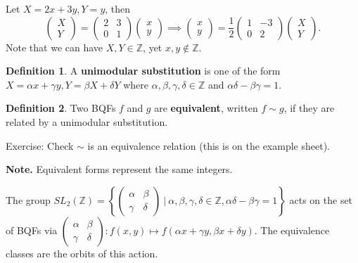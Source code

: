 \documentclass{article}
\theoremstyle{definition}
\newtheorem{defn}{Definition}[section]
\begin{document}
Let $X=2x+3y, Y=y$, then $$\begin{pmatrix} X\\Y \end{pmatrix} = \begin{pmatrix} 2 & 3\\0 & 1 \end{pmatrix}\begin{pmatrix} x \\y \end{pmatrix} \implies \begin{pmatrix} x\\y \end{pmatrix} = \frac{1}{2}\begin{pmatrix} 1 & -3 \\0 & 2 \end{pmatrix}\begin{pmatrix} X \\ Y \end{pmatrix}.$$
Note that we can have $X,Y \in \mathbb{Z}$, yet $x,y \not\in \mathbb{Z}$. 

\begin{defn}
    A \textbf{unimodular substitution} is one of the form $X = \alpha x + \gamma y, Y = \beta X + \delta Y$ where $\alpha,\beta,\gamma,\delta \in \mathbb{Z}$ and $\alpha \delta - \beta \gamma = 1$. 
\end{defn}
\begin{defn}
    Two BQFs $f$ and $g$ are \textbf{equivalent}, written $f\sim g$, if they are related by a unimodular substitution.
\end{defn}
Exercise: Check $\sim$ is an equivalence relation (this is on the example sheet).

\textbf{Note.} Equivalent forms represent the same integers.
\vspace{1mm}

The group $SL_2(\mathbb{Z}) = \left\{\begin{pmatrix} \alpha &\beta \\ \gamma& \delta \end{pmatrix} ~|~ \alpha,\beta,\gamma,\delta \in \mathbb{Z}, \alpha \delta - \beta \gamma = 1\right\}$ acts on the set of BQFs via $\begin{pmatrix} \alpha &\beta \\ \gamma&\delta \end{pmatrix} : f(x,y) \mapsto f(\alpha x + \gamma y, \beta x + \delta y)$. The equivalence classes are the orbits of this action.
\end{document}
